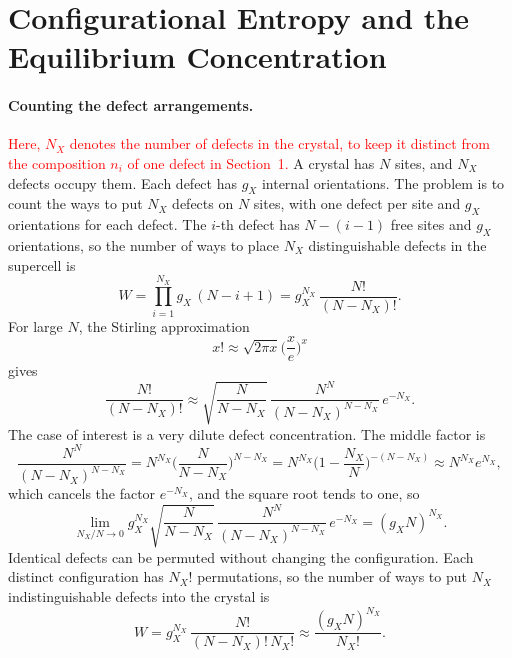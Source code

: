 \section{Configurational Entropy and the Equilibrium Concentration}

\paragraph{Counting the defect arrangements.}
\textcolor{red}{Here, $N_X$ denotes the number of defects in the crystal, to
keep it distinct from the composition $n_i$ of one defect in Section~1.}
A crystal has $N$ sites, and $N_X$ defects occupy them. Each defect has $g_X$
internal orientations. The problem is to count the ways to put $N_X$ defects
on $N$ sites, with one defect per site and $g_X$ orientations for each
defect. The $i$-th defect has $N-(i-1)$ free sites and $g_X$ orientations,
so the number of ways to place $N_X$ distinguishable defects in the
supercell is
\begin{equation*}
    W=\prod_{i=1}^{N_X}g_X\,(N-i+1)=g_X^{N_X}\,\frac{N!}{(N-N_X)!}.
\end{equation*}
For large $N$, the Stirling approximation
\begin{equation*}
    x!\approx\sqrt{2\pi x}\bigg(\frac{x}{e}\bigg)^{x}
\end{equation*}
gives
\begin{equation*}
    \frac{N!}{(N-N_X)!}\approx\sqrt{\frac{N}{N-N_X}}\,
    \frac{N^{N}}{(N-N_X)^{N-N_X}}\,e^{-N_X}.
\end{equation*}
The case of interest is a very dilute defect concentration. The middle
factor is
\begin{equation*}
    \frac{N^{N}}{(N-N_X)^{N-N_X}}
    =N^{N_X}\bigg(\frac{N}{N-N_X}\bigg)^{N-N_X}
    =N^{N_X}\bigg(1-\frac{N_X}{N}\bigg)^{-(N-N_X)}
    \approx N^{N_X}e^{N_X},
\end{equation*}
which cancels the factor $e^{-N_X}$, and the square root tends to one, so
\begin{equation*}
    \lim_{N_X/N\to 0}g_X^{N_X}\sqrt{\frac{N}{N-N_X}}\,
    \frac{N^{N}}{(N-N_X)^{N-N_X}}\,e^{-N_X}=(g_XN)^{N_X}.
\end{equation*}
Identical defects can be permuted without changing the configuration. Each
distinct configuration has $N_X!$ permutations, so the number of ways to put
$N_X$ indistinguishable defects into the crystal is
\begin{equation}
    \boxed{W=g_X^{N_X}\,\frac{N!}{(N-N_X)!\,N_X!}
    \approx\frac{(g_XN)^{N_X}}{N_X!}.}
\end{equation}

